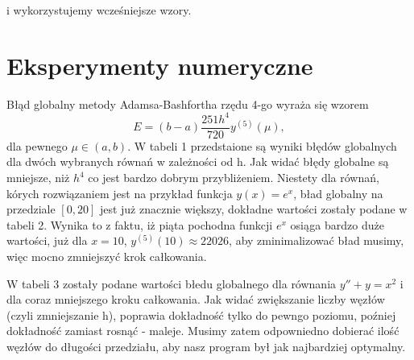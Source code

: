 \documentclass[a4paper,12pt]{article}
\begin{document}
         i wykorzystujemy wcześniejsze wzory.
\section*{Eksperymenty numeryczne}
Błąd globalny metody Adamsa-Bashfortha rzędu 4-go wyraża się wzorem 
\[ E = (b - a)\frac{251h^4}{720}y^{(5)}(\mu),\]
dla pewnego $\mu \in (a,b)$. W tabeli 1 przedstaione są wyniki błędów globalnych dla dwóch wybranych równań w zależności od h. Jak widać błędy globalne są mniejsze, niż $h^4$ co jest bardzo dobrym przybliżeniem. Niestety dla równań, kórych rozwiązaniem jest na przykład funkcja $y(x) = e^x$, bład globalny na przedziale $[0, 20]$ jest już znacznie większy, dokładne wartości zostały podane w tabeli 2. Wynika to z faktu, iż piąta pochodna funkcji $e^x$ osiąga bardzo duże wartości, już dla $x = 10$, $y^{(5)}(10) \approx 22026$, aby zminimalizować bład musimy, więc mocno zmniejszyć krok całkowania.

W tabeli 3 zostały podane wartości błedu globalnego dla równania $y'' + y = x^{2}$ i dla coraz mniejszego kroku całkowania. Jak widać zwiększanie liczby węzłów (czyli zmniejszanie h), poprawia dokładność tylko do pewngo poziomu, poźniej dokładność zamiast rosnąć - maleje. Musimy zatem odpowniedno dobierać ilość węzłów do długości przedziału, aby nasz program był jak najbardziej optymalny. 
\end{document}
